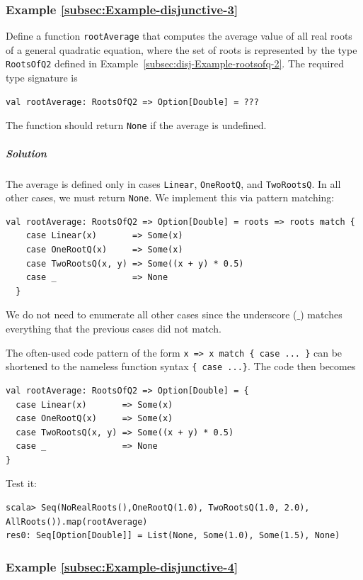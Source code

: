 \subsubsection{Example \label{subsec:Example-disjunctive-3}\ref{subsec:Example-disjunctive-3}}

Define a function \lstinline!rootAverage! that computes the average
value of all real roots of a general quadratic equation, where the
set of roots is represented by the type \lstinline!RootsOfQ2! defined
in Example~\ref{subsec:disj-Example-rootsofq-2}. The required type
signature is
\begin{lstlisting}
val rootAverage: RootsOfQ2 => Option[Double] = ???
\end{lstlisting}
The function should return \lstinline!None! if the average is undefined.

\subparagraph{Solution}

The average is defined only in cases \lstinline!Linear!, \lstinline!OneRootQ!,
and \lstinline!TwoRootsQ!. In all other cases, we must return \lstinline!None!.
We implement this via pattern matching:
\begin{lstlisting}
val rootAverage: RootsOfQ2 => Option[Double] = roots => roots match {
    case Linear(x)       => Some(x)
    case OneRootQ(x)     => Some(x)
    case TwoRootsQ(x, y) => Some((x + y) * 0.5)
    case _               => None
  }
\end{lstlisting}
We do not need to enumerate all other cases since the underscore ($\_$)
matches everything that the previous cases did not match.

The often-used code pattern of the form \lstinline!x => x match { case ... }!
can be shortened to the nameless function syntax \lstinline!{ case ...}!.
The code then becomes
\begin{lstlisting}
val rootAverage: RootsOfQ2 => Option[Double] = {
  case Linear(x)       => Some(x)
  case OneRootQ(x)     => Some(x)
  case TwoRootsQ(x, y) => Some((x + y) * 0.5)
  case _               => None
}
\end{lstlisting}
Test it:
\begin{lstlisting}
scala> Seq(NoRealRoots(),OneRootQ(1.0), TwoRootsQ(1.0, 2.0), AllRoots()).map(rootAverage)
res0: Seq[Option[Double]] = List(None, Some(1.0), Some(1.5), None)
\end{lstlisting}


\subsubsection{Example \label{subsec:Example-disjunctive-4}\ref{subsec:Example-disjunctive-4}}

